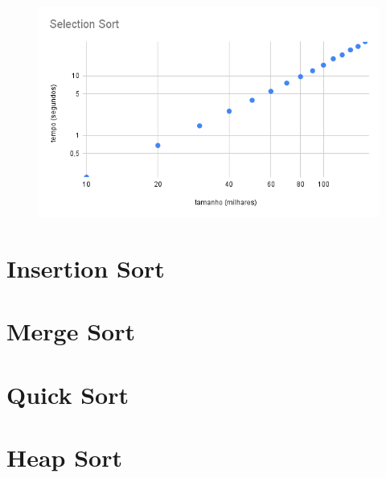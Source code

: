   \begin{figure}
    \includegraphics[width=\textwidth]{imagens/SelectionSort2.png}
  \end{figure}

  
\section{Insertion Sort}
\section{Merge Sort}
\section{Quick Sort}
\section{Heap Sort}
